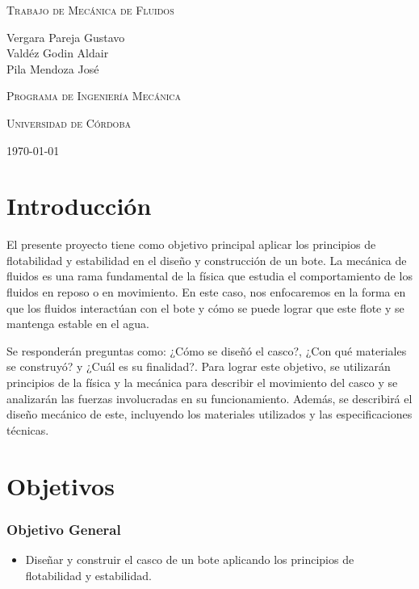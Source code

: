 \documentclass[letterpaper]{article}
\begin{document}
 
\pgfplotsset{compat=1.18}
\begin{titlepage}
	\centering
	\vspace{3cm}
	{\scshape\Huge Trabajo de Mecánica de Fluidos \par}
	\vspace{3cm}
	\textbf\large\scshape{\par}
	\vspace{3cm}

	{\Large Vergara Pareja Gustavo\\Valdéz Godin Aldair\\Pila Mendoza José\par}
	\vspace{5cm}
	{\scshape\Large Programa de Ingeniería Mecánica \par}
	{\scshape\Large Universidad de Córdoba\par}
	{\Large \today \par}
\end{titlepage}
\tableofcontents
\newpage
\section{Introducción}
El presente proyecto tiene como objetivo principal aplicar los principios de flotabilidad y estabilidad 
en el diseño y construcción de un bote. La mecánica de fluidos es una rama fundamental de la física que 
estudia el comportamiento de los fluidos en reposo o en movimiento. En este caso, nos enfocaremos en la 
forma en que los fluidos interactúan con el bote y cómo se puede lograr que este flote y se mantenga 
estable en el agua.
\newline

Se responderán preguntas
como: ¿Cómo se diseñó el casco?, ¿Con qué materiales se construyó? y ¿Cuál es su finalidad?.
\newline
Para lograr este objetivo, se utilizarán principios de la física y la mecánica para describir
el movimiento del casco y se analizarán las fuerzas involucradas en su funcionamiento.
Además, se describirá el diseño mecánico de este, incluyendo los materiales utilizados
y las especificaciones técnicas.
\newpage
\section{Objetivos}
\subsubsection{Objetivo General}
\begin{itemize}
	\item Diseñar y construir el casco de un bote aplicando los principios de flotabilidad y estabilidad.
\end{itemize}
\end{document}

